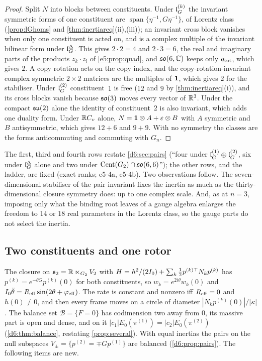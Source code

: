 \begin{proof}
Split $N$ into blocks between constituents. Under $\mathfrak l_G^{(k)}$ the invariant symmetric forms of one constituent are $\operatorname{span}\{\eta^{-1},G\eta^{-1}\}$,
of Lorentz class (\cref{prop:lGhoms} and \cref{thm:inertiareq}(ii),(iii)); an invariant cross block vanishes when only one constituent is acted on, and
is a complex multiple of the invariant bilinear form under $\mathfrak l_G^\Delta$. This gives $2\cdot2=4$ and $2\cdot3=6$, the real and imaginary parts of the
products $z_k\cdot z_l$ of \cref{e5:prop:quad}, and $\mathfrak{so}(6,\mathbb{C})$ keeps only $q_{\rm tot}$, which gives $2$. A copy rotation acts on the copy index, and the
copy-rotation-invariant complex symmetric $2\times2$ matrices are the multiples of $\mathbf 1$, which gives $2$ for the stabiliser. Under $\mathfrak l_G^{(2)}$ constituent~$1$ is
free ($12$ and $9$ by \cref{thm:inertiareq}(i)), and its cross blocks vanish because $\mathfrak{so}(3)$ moves every vector of $\mathbb{R}^3$. Under the compact $\mathfrak{su}(2)$
alone the identity of constituent~$2$ is also invariant, which adds one duality form. Under $\mathbb{R} C_v$ alone, $N=\mathbf 1\otimes A+\varepsilon\otimes B$ with $A$
symmetric and $B$ antisymmetric, which gives $12+6$ and $9+9$. With no symmetry the classes are the forms anticommuting and commuting with $G_n$.
\end{proof}

The first, third and fourth rows restate \cref{d6:sec:pairs} (``four under $\mathfrak l_G^{(1)}\oplus\mathfrak l_G^{(2)}$, six under $\mathfrak l_G^\Delta$ alone and two under
$\operatorname{Cent}(G_2)\cap\mathfrak{so}(6,6)$''); the other rows, and the ladder, are fixed (exact ranks; e5-4a, e5-4b). Two observations follow. The seven-dimensional
stabiliser of the pair invariant fixes the inertia as much as the thirty-dimensional closure symmetry does: up to one complex scale. And, as at $n=3$, imposing
only what the binding root leaves of a gauge algebra enlarges the freedom to $14$ or $18$ real parameters in the Lorentz class, so the gauge parts do not
select the inertia.

\subsection{Two constituents and one rotor}
\label{e5:sec:rotor}

The closure on $\mathfrak s_2=\mathbb{R}\ltimes_{G_2}V_2$ with $H=h^2/(2I_0)+\sum_k\tfrac12 p^{(k)\top}N_kp^{(k)}$ has $p^{(k)}=e^{-\theta G}p^{(k)}(0)$ for both
constituents, so $w_k=e^{2i\theta}w_k(0)$ and $I_0\ddot\theta=R_{\rm eff}\sin(2\theta+\varphi_{\rm eff})$. The rate is constant and nonzero iff
$R_{\rm eff}=0$ and $h(0)\neq0$, and then every frame moves on a circle of diameter $|N_kp^{(k)}(0)|/|\kappa|$. The balance set $\mathcal B=\{F=0\}$ has
codimension two away from $0$, its massive part is open and dense, and on it $|c_1|E_0(\pi^{(1)})=|c_2|E_0(\pi^{(2)})$ (\cref{d6:thm:balance}, restating
\cref{prop:several}). With equal inertias the pairs on the null subspaces $V_\pm=\{p^{(2)}=\mp Gp^{(1)}\}$ are balanced (\cref{d6:prop:pairs}). The following items are new.


